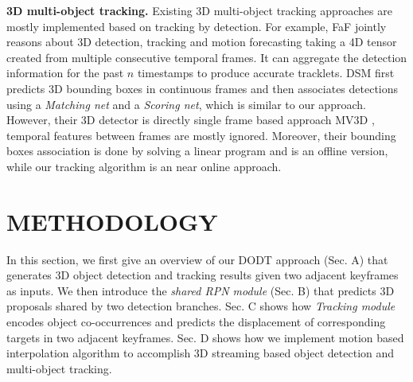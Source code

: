 \documentclass[letterpaper, 10 pt, conference]{ieeeconf}  %
\begin{document}

\textbf{3D multi-object tracking.} Existing 3D multi-object tracking approaches are mostly implemented based on tracking by detection. For example, FaF \cite{luo2018fast} jointly reasons about 3D detection, tracking and motion forecasting taking a 4D tensor created from multiple consecutive temporal frames. It can aggregate the detection information for the past $n$ timestamps to produce accurate tracklets. DSM \cite{frossard2018end} first predicts 3D bounding boxes in continuous frames and then associates detections using a \textit{Matching net} and a \textit{Scoring net}, which is similar to our approach. However, their 3D detector is directly single frame based approach MV3D \cite{chen2017multi}, temporal features between frames are mostly ignored. Moreover, their bounding boxes association is done by solving a linear program and is an offline version, while our tracking algorithm is an near online approach.


\section{METHODOLOGY}

In this section, we first give an overview of our DODT approach (Sec. A) that generates 3D object detection and tracking results given two adjacent keyframes as inputs. We then introduce the \textit{shared RPN module} (Sec. B) that predicts 3D proposals shared by two detection branches. Sec. C shows how \textit{Tracking module} encodes object co-occurrences and predicts the displacement of corresponding targets in two adjacent keyframes. Sec. D shows how we implement motion based interpolation algorithm to accomplish 3D streaming based object detection and multi-object tracking.
\end{document}
